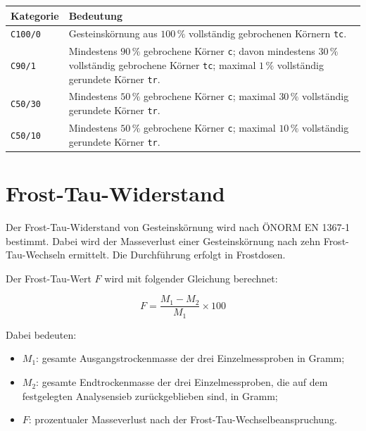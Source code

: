 \documentclass[
  12pt,
  a4paper,
  oneside
]{scrreprt}
\begin{document}
\begin{longtable}{
  >{\centering\arraybackslash}p{}
  >{\raggedright\arraybackslash}p{}
}
\toprule
\textbf{Kategorie} &
\textbf{Bedeutung} \\
\midrule
\endhead

\texttt{C100/0} &
Gesteinskörnung aus $100\,\%$ vollständig gebrochenen Körnern
\texttt{tc}. \\

\texttt{C90/1} &
Mindestens $90\,\%$ gebrochene Körner \texttt{c}; davon mindestens
$30\,\%$ vollständig gebrochene Körner \texttt{tc}; maximal
$1\,\%$ vollständig gerundete Körner \texttt{tr}. \\

\texttt{C50/30} &
Mindestens $50\,\%$ gebrochene Körner \texttt{c}; maximal
$30\,\%$ vollständig gerundete Körner \texttt{tr}. \\

\texttt{C50/10} &
Mindestens $50\,\%$ gebrochene Körner \texttt{c}; maximal
$10\,\%$ vollständig gerundete Körner \texttt{tr}. \\

\bottomrule
\end{longtable}



\section{Frost-Tau-Widerstand}

Der Frost-Tau-Widerstand von Gesteinskörnung wird nach
ÖNORM EN 1367-1 bestimmt. Dabei wird der Masseverlust einer
Gesteinskörnung nach zehn Frost-Tau-Wechseln ermittelt. Die
Durchführung erfolgt in Frostdosen. 

Der Frost-Tau-Wert $F$ wird mit folgender Gleichung berechnet:

\begin{equation}
  F =
  \frac{M_1-M_2}{M_1}
  \times 100
\end{equation}

Dabei bedeuten:

\begin{itemize}
  \item $M_1$: gesamte Ausgangstrockenmasse der drei
  Einzelmessproben in Gramm;
  \item $M_2$: gesamte Endtrockenmasse der drei Einzelmessproben,
  die auf dem festgelegten Analysensieb zurückgeblieben sind, in Gramm;
  \item $F$: prozentualer Masseverlust nach der
  Frost-Tau-Wechselbeanspruchung.
\end{itemize}
\end{document}
